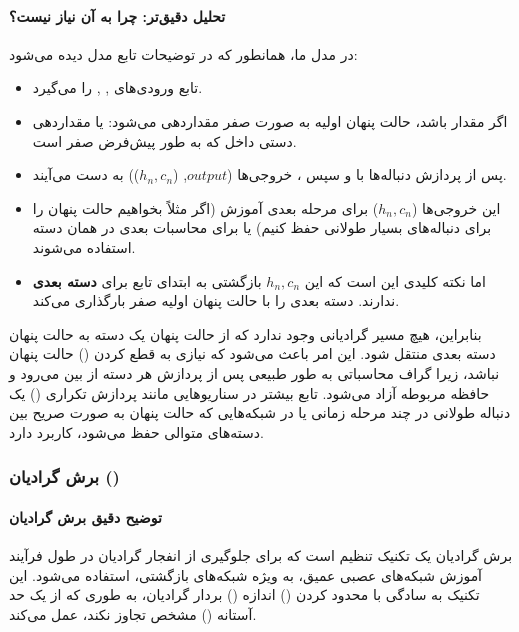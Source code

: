 \documentclass{article}
\begin{document}
\paragraph{تحلیل دقیق‌تر: چرا به آن نیاز نیست؟}
در مدل  ما، همانطور که در توضیحات تابع  مدل دیده می‌شود:
\begin{itemize}
	\item تابع  ورودی‌های , ,  را می‌گیرد.
	\item اگر  مقدار  باشد، حالت پنهان اولیه به صورت صفر مقداردهی می‌شود:  یا مقداردهی دستی داخل  که به طور پیش‌فرض صفر است.
	\item پس از پردازش دنباله‌ها با  و سپس ، خروجی‌ها (\(output\), (\(h_n, c_n\))) به دست می‌آیند.
	\item این خروجی‌ها (\(h_n, c_n\)) برای مرحله بعدی آموزش (اگر مثلاً بخواهیم حالت پنهان را برای دنباله‌های بسیار طولانی حفظ کنیم) یا برای محاسبات بعدی در همان دسته استفاده می‌شوند.
	\item اما نکته کلیدی این است که این \(h_n, c_n\) بازگشتی به ابتدای تابع  برای \textbf{دسته بعدی} ندارند.  دسته بعدی را با حالت پنهان اولیه صفر بارگذاری می‌کند.
\end{itemize}
بنابراین، هیچ مسیر گرادیانی وجود ندارد که از حالت پنهان یک دسته به حالت پنهان دسته بعدی منتقل شود. این امر باعث می‌شود که نیازی به قطع کردن () حالت پنهان نباشد، زیرا گراف محاسباتی به طور طبیعی پس از پردازش هر دسته از بین می‌رود و حافظه مربوطه آزاد می‌شود. تابع  بیشتر در سناریوهایی مانند پردازش تکراری () یک دنباله طولانی در چند مرحله زمانی یا در شبکه‌هایی که حالت پنهان به صورت صریح بین دسته‌های متوالی حفظ می‌شود، کاربرد دارد.

\subsubsection{برش گرادیان ()}

\paragraph{توضیح دقیق برش گرادیان}
برش گرادیان یک تکنیک تنظیم  است که برای جلوگیری از انفجار گرادیان در طول فرآیند آموزش شبکه‌های عصبی عمیق، به ویژه شبکه‌های بازگشتی، استفاده می‌شود. این تکنیک به سادگی با محدود کردن () اندازه () بردار گرادیان، به طوری که از یک حد آستانه () مشخص تجاوز نکند، عمل می‌کند.
\end{document}
